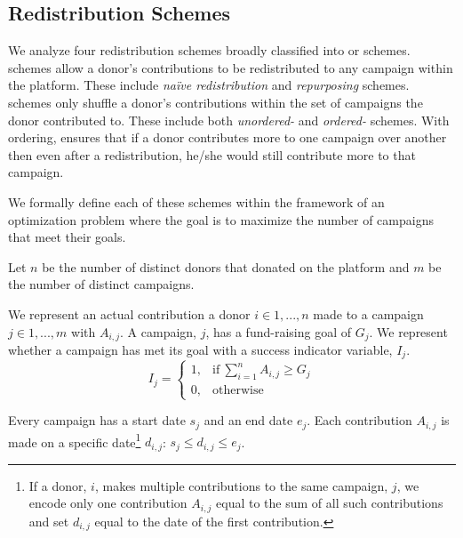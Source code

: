 \subsection{Redistribution Schemes}
\label{sec:model}

We analyze four redistribution schemes broadly classified into \textit{\car} or \textit{\cpr} schemes. \Car schemes allow a donor's contributions to be redistributed to any campaign within the platform. These include \textit{na\"ive redistribution} and \textit{repurposing} schemes. \Cpr schemes only shuffle a donor's contributions within the set of campaigns the donor contributed to. These include both \textit{unordered-} and \textit{ordered-} \cpr schemes. With ordering, \cpr ensures that if a donor contributes more to one campaign over another then even after a redistribution, he/she would still contribute more to that campaign.

We formally define each of these schemes within the framework of an optimization problem where the goal is to maximize the number of campaigns that meet their goals.


Let $n$ be the number of distinct donors that donated on the \lag platform and $m$ be the number of distinct campaigns. 

We represent an actual contribution a donor $i \in {1,..., n}$ made to a campaign $j \in {1,..., m}$ with $A_{i,j}$. A campaign, $j$, has a fund-raising goal of $G_j$. We represent whether a campaign has met its goal with a success indicator variable, $I_j$.
\[I_j =
\begin{cases}
    1, & \text{if} \ \displaystyle \sum_{i=1}^{n} A_{i, j} \geq G_j\\
    0, & \text{otherwise}
\end{cases}\]

Every campaign has a start date $s_j$ and an end date $e_j$. Each contribution $A_{i,j}$ is made on a specific date\footnote{If a donor, $i$, makes multiple contributions to the same campaign, $j$, we encode only one contribution $A_{i,j}$ equal to the sum of all such contributions and set $d_{i,j}$ equal to the date of the first contribution.} $d_{i,j}$: $s_j \leq d_{i, j} \leq e_j$.

